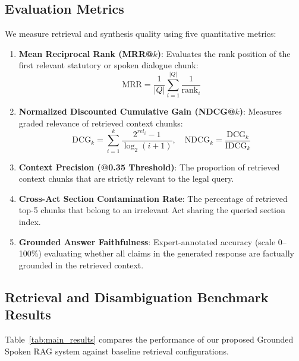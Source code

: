 \documentclass{llncs}
\begin{document}
\subsection{Evaluation Metrics}
We measure retrieval and synthesis quality using five quantitative metrics:
\begin{enumerate}
    \item \textbf{Mean Reciprocal Rank (MRR@$k$)}: Evaluates the rank position of the first relevant statutory or spoken dialogue chunk:
    \begin{equation}
    \text{MRR} = \frac{1}{|Q|} \sum_{i=1}^{|Q|} \frac{1}{\text{rank}_i}
    \end{equation}
    \item \textbf{Normalized Discounted Cumulative Gain (NDCG@$k$)}: Measures graded relevance of retrieved context chunks:
    \begin{equation}
    \text{DCG}_k = \sum_{i=1}^k \frac{2^{rel_i} - 1}{\log_2(i + 1)}, \quad \text{NDCG}_k = \frac{\text{DCG}_k}{\text{IDCG}_k}
    \end{equation}
    \item \textbf{Context Precision (@0.35 Threshold)}: The proportion of retrieved context chunks that are strictly relevant to the legal query.
    \item \textbf{Cross-Act Section Contamination Rate}: The percentage of retrieved top-5 chunks that belong to an irrelevant Act sharing the queried section index.
    \item \textbf{Grounded Answer Faithfulness}: Expert-annotated accuracy (scale 0--100\%) evaluating whether all claims in the generated response are factually grounded in the retrieved context.
\end{enumerate}

\subsection{Retrieval and Disambiguation Benchmark Results}
Table~\ref{tab:main_results} compares the performance of our proposed Grounded Spoken RAG system against baseline retrieval configurations.
\end{document}
